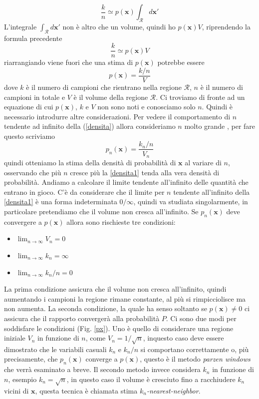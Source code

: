 \begin{equation}
\frac{k}{n} \simeq p(\mathbf{x}) \int_{\mathcal{R}} d\mathbf{x}'
\end{equation}
L'integrale $ \int_{\mathcal{R}} d\mathbf{x}'$ non è altro che un volume, quindi ho $p(\mathbf{x})V$, riprendendo la formula precedente 
\begin{equation}
\frac{k}{n} \simeq p(\mathbf{x})V
\end{equation}
riarrangiando viene fuori che una stima di $p(\mathbf{x})$ potrebbe essere
\begin{equation}\label{densita}
p(\mathbf{x}) = \frac{k/n}{V}
\end{equation}
dove $k$ è il numero di campioni che rientrano nella regione $\mathcal{R}$, $n$ è il numero di campioni in totale e $V$ è il volume della regione $\mathcal{R}$. Ci troviamo di fronte ad un equazione di cui $p(\mathbf{x})$, $k$ e $V$ non sono noti e conosciamo solo $n$. Quindi è necessario introdurre altre considerazioni. Per vedere il comportamento di $n$ tendente ad infinito della (\ref{densita}) allora consideriamo $n$ molto grande , per fare questo scriviamo 
\begin{equation}\label{densita1}
p_n(\mathbf{x}) = \frac{k_n/n}{V_n}
\end{equation}
quindi otteniamo la stima della densità di probabilità di $\mathbf{x}$ al variare di $n$, osservando che più $n$ cresce più la \ref{densita1} tenda alla vera densità di probabilità. Andiamo a calcolare il limite tendente all'infinito delle quantità che entrano in gioco. C'è da considerare che il limite per $n$ tendente all'infinito della \ref{densita1} è una forma indeterminata $0/\infty$, quindi va studiata singolarmente, in particolare pretendiamo che il volume non cresca all'infinito. Se $p_n(\mathbf{x})$ deve convergere a $p(\mathbf{x})$ allora sono rischieste tre condizioni: 
\begin{itemize}
\item $\lim_{n\to \infty} V_n = 0$
\item $\lim_{n\to \infty} k_n = \infty$
\item $\lim_{n\to \infty} k_n/n = 0$
\end{itemize}
La prima condizione assicura che il volume non cresca all'infinito, quindi aumentando i campioni la regione rimane constante, al più si rimpicciolisce ma non aumenta. La seconda condizione, la quale ha senso soltanto se $p(\mathbf{x}) \neq 0$ ci assicura che il rapporto convergerà alla probabilità $P$. Ci sono due modi per soddisfare le condizioni (Fig. \ref{px}). Uno è quello di considerare una regione iniziale $V_n$ in funzione di $n$, come $V_n = 1/\sqrt{n}$, inquesto caso deve essere dimostrato che le variabili casuali $k_n$ e $k_n / n$ si comportano correttamente o, più precisamente, che $p_n(\mathbf{x})$ converge a $p(\mathbf{x})$, questo è il metodo \emph{parzen windows} che verrà esaminato a breve. Il secondo metodo invece considera $k_n$ in funzione di $n$, esempio $k_n = \sqrt{n}$, in questo caso il volume è cresciuto fino a racchiudere $k_n$ vicini di $\mathbf{x}$, questa tecnica è chiamata stima \emph{$k_n$-nearest-neighbor}.

